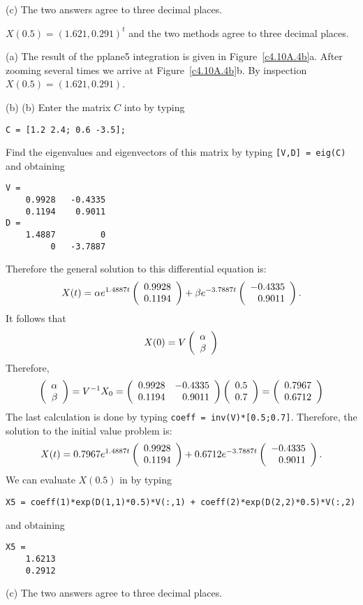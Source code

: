 \documentclass{ximera}
\begin{document}
(c)  The two answers agree to three decimal places.

\begin{figure}[htb]
                       \centerline{%
                       }
\end{figure}



 \ans $X(0.5) = (1.621,0.291)^t$ and the two methods agree to three 
decimal places.

\soln (a) The result of the {\sf pplane5} integration is given in 
Figure~\ref{c4.10A.4b}a. After zooming several times we arrive at
Figure~\ref{c4.10A.4b}b.  By inspection $X(0.5)=(1.621,0.291)$.

(b) (b)  Enter the matrix $C$ into \Matlab by typing
\begin{verbatim}
C = [1.2 2.4; 0.6 -3.5];
\end{verbatim}
Find the eigenvalues and eigenvectors of this matrix by typing {\tt [V,D] = eig(C)}
and obtaining
\begin{verbatim}
V =
    0.9928   -0.4335
    0.1194    0.9011
D =
    1.4887         0
         0   -3.7887
\end{verbatim}
Therefore the general solution to this differential equation is:
\[
X(t) = \alpha e^{1.4887 t}\left(\begin{array}{r} 0.9928 \\ 0.1194\end{array}\right) +
\beta e^{-3.7887 t}\left(\begin{array}{r} -0.4335 \\ 0.9011\end{array}\right).
\]
It follows that 
\[
X(0) = V \left(\begin{array}{r} \alpha \\ \beta\end{array}\right)
\]
Therefore,
\[
\left(\begin{array}{r} \alpha \\ \beta\end{array}\right) = V^{-1} X_0 = 
\left(\begin{array}{rr} 0.9928 & -0.4335\\ 0.1194 &0.9011\end{array}\right)\left(\begin{array}{r} 0.5 \\ 0.7\end{array}\right) = \left(\begin{array}{r} 0.7967 \\ 0.6712\end{array}\right)
\]
The last calculation is done by typing {\tt coeff = inv(V)*[0.5;0.7]}. 
Therefore, the solution to the initial value problem is:
\[
X(t) = 0.7967e^{1.4887 t}\left(\begin{array}{r} 0.9928 \\ 0.1194\end{array}\right) +
0.6712e^{-3.7887 t}\left(\begin{array}{r} -0.4335 \\ 0.9011\end{array}\right).
\]
We can evaluate $X(0.5)$ in \Matlab by typing
\begin{verbatim}
X5 = coeff(1)*exp(D(1,1)*0.5)*V(:,1) + coeff(2)*exp(D(2,2)*0.5)*V(:,2)
\end{verbatim}
and obtaining
\begin{verbatim}
X5 =
    1.6213
    0.2912
\end{verbatim}

(c)  The two answers agree to three decimal places.


\begin{figure}[htb]
                       \centerline{%
                       }
\end{figure}
\end{document}
